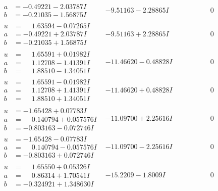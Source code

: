 \documentclass[1p]{elsarticle_modified}
\theoremstyle{definition}
\begin{document}
$$\begin{array}{c|c|c}
\begin{aligned}
a &= -0.49221 - 2.03787 I \\
b &= -0.21035 - 1.56875 I\end{aligned}
 & -9.51163 - 2.28865 I & \phantom{-0.000000 } 0 \\ \hline\begin{aligned}
u &= \phantom{-}1.63594 - 0.07265 I \\
a &= -0.49221 + 2.03787 I \\
b &= -0.21035 + 1.56875 I\end{aligned}
 & -9.51163 + 2.28865 I & \phantom{-0.000000 } 0 \\ \hline\begin{aligned}
u &= \phantom{-}1.65591 + 0.01982 I \\
a &= \phantom{-}1.12708 - 1.41391 I \\
b &= \phantom{-}1.88510 - 1.34051 I\end{aligned}
 & -11.46620 - 0.48828 I & \phantom{-0.000000 } 0 \\ \hline\begin{aligned}
u &= \phantom{-}1.65591 - 0.01982 I \\
a &= \phantom{-}1.12708 + 1.41391 I \\
b &= \phantom{-}1.88510 + 1.34051 I\end{aligned}
 & -11.46620 + 0.48828 I & \phantom{-0.000000 } 0 \\ \hline\begin{aligned}
u &= -1.65428 + 0.07783 I \\
a &= \phantom{-}0.140794 + 0.057576 I \\
b &= -0.803163 - 0.072746 I\end{aligned}
 & -11.09700 + 2.25616 I & \phantom{-0.000000 } 0 \\ \hline\begin{aligned}
u &= -1.65428 - 0.07783 I \\
a &= \phantom{-}0.140794 - 0.057576 I \\
b &= -0.803163 + 0.072746 I\end{aligned}
 & -11.09700 - 2.25616 I & \phantom{-0.000000 } 0 \\ \hline\begin{aligned}
u &= \phantom{-}1.65550 + 0.05326 I \\
a &= \phantom{-}0.86314 + 1.70541 I \\
b &= -0.324921 + 1.348630 I\end{aligned}
 & -15.2209 - 1.8009 I & \phantom{-0.000000 } 0 \\ \hline\begin{aligned}

\end{aligned}
\end{array}$$
\end{document}
